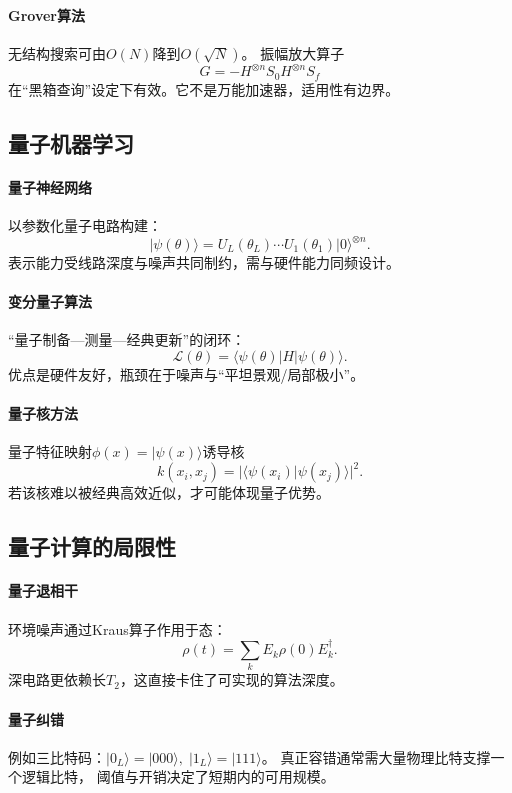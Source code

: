 \paragraph{Grover算法}
无结构搜索可由$O(N)$降到$O(\sqrt{N})$。  
振幅放大算子
$$G=-H^{\otimes n}S_0H^{\otimes n}S_f$$
在“黑箱查询”设定下有效。\;它不是万能加速器，适用性有边界。

\subsection{量子机器学习}

\paragraph{量子神经网络}
以参数化量子电路构建：
$$|\psi(\theta)\rangle=U_L(\theta_L)\cdots U_1(\theta_1)|0\rangle^{\otimes n}.$$
表示能力受线路深度与噪声共同制约，需与硬件能力同频设计。

\paragraph{变分量子算法}
“量子制备—测量—经典更新”的闭环：
$$\mathcal{L}(\theta)=\langle\psi(\theta)|H|\psi(\theta)\rangle.$$
优点是硬件友好，瓶颈在于噪声与“平坦景观/局部极小”。

\paragraph{量子核方法}
量子特征映射$\phi(x)=|\psi(x)\rangle$诱导核
$$k(x_i,x_j)=|\langle\psi(x_i)|\psi(x_j)\rangle|^2.$$
若该核难以被经典高效近似，才可能体现量子优势。

\subsection{量子计算的局限性}

\paragraph{量子退相干}
环境噪声通过Kraus算子作用于态：
$$\rho(t)=\sum_k E_k\rho(0)E_k^\dagger.$$
深电路更依赖长$T_2$，这直接卡住了可实现的算法深度。

\paragraph{量子纠错}
例如三比特码：$|0_L\rangle=|000\rangle,\;|1_L\rangle=|111\rangle$。  
真正容错通常需大量物理比特支撑一个逻辑比特，  
阈值与开销决定了短期内的可用规模。

